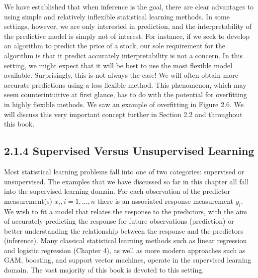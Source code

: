 \documentclass[10pt]{article}
\begin{document}
We have established that when inference is the goal, there are clear advantages to using simple and relatively inflexible statistical learning methods. In some settings, however, we are only interested in prediction, and the interpretability of the predictive model is simply not of interest. For instance, if we seek to develop an algorithm to predict the price of a stock, our sole requirement for the algorithm is that it predict accurately interpretability is not a concern. In this setting, we might expect that it will be best to use the most flexible model available. Surprisingly, this is not always the case! We will often obtain more accurate predictions using a less flexible method. This phenomenon, which may seem counterintuitive at first glance, has to do with the potential for overfitting in highly flexible methods. We saw an example of overfitting in Figure 2.6. We will discuss this very important concept further in Section 2.2 and throughout this book.

\subsection*{2.1.4 Supervised Versus Unsupervised Learning}
Most statistical learning problems fall into one of two categories: supervised or unsupervised. The examples that we have discussed so far in this chapter all fall into the supervised learning domain. For each observation of the predictor measurement(s) $x_{i}, i=1, \ldots, n$ there is an associated response measurement $y_{i}$. We wish to fit a model that relates the response to the predictors, with the aim of accurately predicting the response for future observations (prediction) or better understanding the relationship between the response and the predictors (inference). Many classical statistical learning methods such as linear regression and logistic regression (Chapter 4), as well as more modern approaches such as GAM, boosting, and support vector machines, operate in the supervised learning domain. The vast majority of this book is devoted to this setting.
\end{document}
